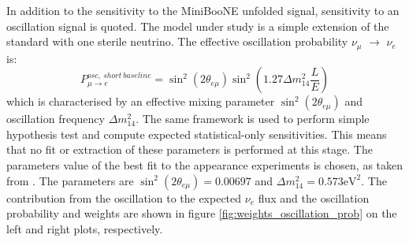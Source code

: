 \documentclass[a4paper]{article}
\newcommand{\nue}{$\nu_e$ }
\newcommand{\numu}{$\nu_{\mu}$ }
\begin{document}
In addition to the sensitivity to the MiniBooNE unfolded signal, sensitivity to an oscillation signal is quoted.
The model under study is a simple extension of the standard with one sterile neutrino.
The effective oscillation probability \numu $\rightarrow$ \nue is:
\begin{equation}
    P^{osc,~short~baseline}_{\mu \rightarrow e} = \sin^2(2\theta_{e \mu}) \sin^2 \left( 1.27 \Delta m_{14}^2 \frac{L}{E} \right)
\end{equation}
which is characterised by an effective mixing parameter $\sin^2(2\theta_{e \mu})$ and oscillation frequency $\Delta m_{14}^2$.
The same framework is used to perform simple hypothesis test and compute expected statistical-only sensitivities.
This means that no fit or extraction of these parameters is performed at this stage. 
The parameters value of the best fit to the appearance experiments is chosen, as taken from \cite{bib:oscillation_parameters}.
The parameters are $\sin^2(2\theta_{e \mu}) = 0.00697$ and $\Delta m_{14}^2 = 0.573 \text{eV}^2$.
The contribution from the oscillation to the expected \nue flux and the oscillation probability and weights are shown in figure \ref{fig:weights_oscillation_prob} on the left and right plots, respectively.
\end{document}

